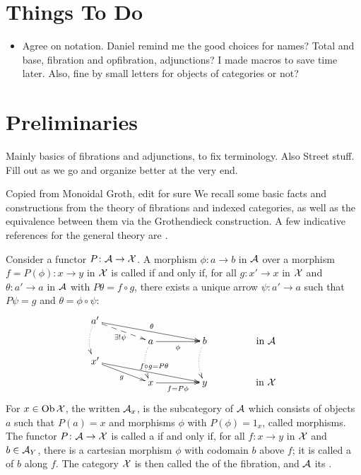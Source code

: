 \documentclass{amsart}
\begin{document}
\section*{Things To Do}
\begin{itemize}
 \item Agree on notation. {\chris Daniel remind me the good choices for names? Total and base, fibration and opfibration, adjunctions? I made macros to save time later. Also, fine by small letters for objects of categories or not?}
\end{itemize}


\section{Preliminaries}

{\chris Mainly basics of fibrations and adjunctions, to fix terminology. Also Street stuff. Fill out as we go and organize better at the very end.
}

{\chris Copied from Monoidal Groth, edit for sure}
We recall some basic facts and constructions from the theory of fibrations and indexed categories, as well as the equivalence between them via the Grothendieck construction.
A few indicative references for the general theory are \cite{Grayfibredandcofibred,FibredAdjunctions,Handbook2,Jacobs,Elephant1}.

Consider a functor $P \colon\mathcal{A} \to \mathcal{X}$. A morphism $\phi \colon a \to b$ in $\mathcal{A} $ over a morphism $f = P(\phi) \colon x \to y$ in $\mathcal{X}$ is called  if and only if, for all $g \colon x' \to x$ in $\mathcal{X}$ and $\theta \colon a'\to a$ in $\mathcal{A} $ with $P \theta = f \circ g$, there exists a unique arrow $\psi \colon a'\to a$ such that $P \psi = g$ and $\theta = \phi \circ \psi$:
\begin{equation}
    \xymatrix @R=.1in @C=.6in
    {a'\ar [drr]^-{\theta}\ar @{-->}[dr]_-{\exists!\psi} 
    \ar @{.>}@/_/[dd] &&& \\
    & a\ar[r]_-{\phi} \ar @{.>}@/_/[dd] & 
    b \ar @{.>}@/_/[dd] & \textrm{in }\A \\
    x'\ar [drr]^-{f\circ g=P\theta}\ar[dr]_-g &&&\\
    & x\ar[r]_-{f=P\phi} & y & \textrm{in }\X}\label{eq:13}
\end{equation}
For $x \in \operatorname{Ob}\mathcal{X}$, the  written $\mathcal{A}_x$, is the subcategory of $\mathcal{A}$ which consists of objects $a$ such that $P(a) = x$ and morphisms $\phi$ with $P(\phi) = 1_x$, called  morphisms. The functor $P \colon \mathcal{A} \to \mathcal{X}$ is called a  if and only if, for all $f \colon x \to y$ in $\mathcal{X}$ and $b\in\mathcal{A}_Y$, there is a cartesian morphism $\phi$ with codomain $b$ above $f$; it is called a  of $b$ along $f$. The category $\mathcal{X}$ is then called the  of the fibration, and $\mathcal{A} $ its .
\end{document}
